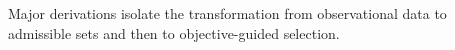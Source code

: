 Major derivations isolate the transformation from observational data to admissible sets and then to objective-guided selection.
